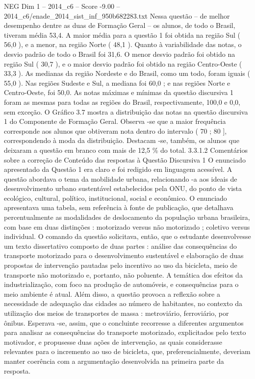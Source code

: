 \begin{textsample}{NEG Dim 1 – 2014\_c6 – Score -9.00 – 2014\_c6/enade\_2014\_sist\_inf\_950b682283.txt}
Nessa questão – de melhor desempenho dentre as duas de Formação Geral – os alunos, de todo o Brasil, tiveram média 53,4.
A maior média para a questão 1 foi obtida na região Sul ( 56,0 ), e a menor, na região Norte ( 48,1 ).
Quanto à variabilidade das notas, o desvio padrão de todo o Brasil foi 31,6.
O menor desvio padrão foi obtido na região Sul ( 30,7 ), e o maior desvio padrão foi obtido na região Centro-Oeste ( 33,3 ).
As medianas da região Nordeste e do Brasil, como um todo, foram iguais ( 55,0 ).
Nas regiões Sudeste e Sul, a mediana foi 60,0 ; e nas regiões Norte e Centro-Oeste, foi 50,0.
As notas máximas e mínimas da questão discursiva 1 foram as mesmas para todas as regiões do Brasil, respectivamente, 100,0 e 0,0, sem exceção.
O Gráfico 3.7 mostra a distribuição das notas na questão discursiva 1 do Componente de Formação Geral.
Observa -se que a maior frequência corresponde aos alunos que obtiveram nota dentro do intervalo ( 70 ; 80 ], correspondendo à moda da distribuição.
Destacam -se, também, os alunos que deixaram a questão em branco com mais de 12,5 \% do total. 3.3.1.2 Comentários sobre a correção de Conteúdo das respostas à Questão Discursiva 1 O enunciado apresentado da Questão 1 era claro e foi redigido em linguagem acessível.
A questão abordava o tema da mobilidade urbana, relacionando -a aos ideais de desenvolvimento urbano sustentável estabelecidos pela ONU, do ponto de vista ecológico, cultural, político, institucional, social e econômico.
O enunciado apresentava uma tabela, sem referência à fonte de publicação, que detalhava percentualmente as modalidades de deslocamento da população urbana brasileira, com base em duas distinções : motorizado versus não motorizado ; coletivo versus individual.
O comando da questão solicitava, então, que o estudante desenvolvesse um texto dissertativo composto de duas partes : análise das consequências do transporte motorizado para o desenvolvimento sustentável e elaboração de duas propostas de intervenção pautadas pelo incentivo ao uso da bicicleta, meio de transporte não motorizado e, portanto, não poluente.
A temática dos efeitos da industrialização, com foco na produção de automóveis, e consequências para o meio ambiente é atual.
Além disso, a questão provoca a reflexão sobre a necessidade de adequação das cidades ao número de habitantes, no contexto da utilização dos meios de transportes de massa : metroviário, ferroviário, por ônibus.
Esperava -se, assim, que o concluinte recorresse a diferentes argumentos para analisar as consequências do transporte motorizado, explicitados pelo texto motivador, e propusesse duas ações de intervenção, as quais considerasse relevantes para o incremento ao uso de bicicleta, que, preferencialmente, deveriam manter coerência com a argumentação desenvolvida na primeira parte da resposta.

\end{textsample}
